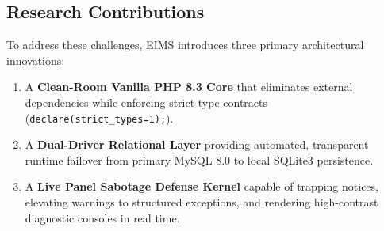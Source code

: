 \subsection{Research Contributions}
To address these challenges, EIMS introduces three primary architectural innovations:
\begin{enumerate}
    \item A \textbf{Clean-Room Vanilla PHP 8.3 Core} that eliminates external dependencies while enforcing strict type contracts (\texttt{declare(strict\_types=1);}).
    \item A \textbf{Dual-Driver Relational Layer} providing automated, transparent runtime failover from primary MySQL 8.0 to local SQLite3 persistence.
    \item A \textbf{Live Panel Sabotage Defense Kernel} capable of trapping notices, elevating warnings to structured exceptions, and rendering high-contrast diagnostic consoles in real time.
\end{enumerate}
